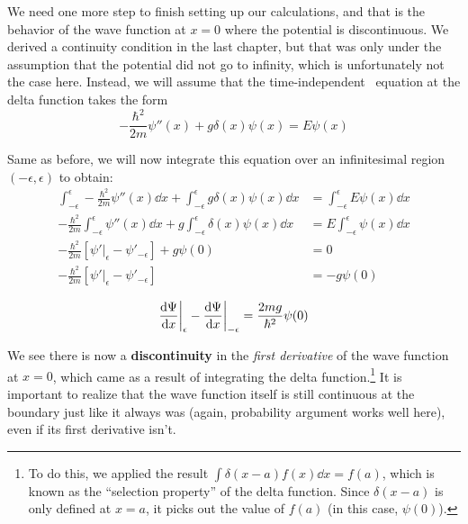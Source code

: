 We need one more step to finish setting up our calculations, and that is the behavior of the wave function at $x=0$ where the potential is discontinuous. We derived a continuity condition in the last chapter, but that was only under the assumption that the potential did not go to infinity, which is unfortunately not the case here. Instead, we will assume that the time-independent \Sch\ equation at the delta function takes the form 
\begin{equation*}
	-\frac{\hbar^2}{2m} \psi''(x) + g\delta(x) \psi(x) = E\psi(x)
\end{equation*}

Same as before, we will now integrate this equation over an infinitesimal region $(-\epsilon,\epsilon)$ to obtain:
\begin{align*}
	\int_{-\epsilon}^{\epsilon} -\frac{\hbar^2}{2m}  \psi''(x) \dd{x} + \int_{-\epsilon}^{\epsilon} g\delta(x) \psi(x) \dd{x} &= \int_{-\epsilon}^{\epsilon} E\psi(x) \dd{x} \\
	-\frac{\hbar^2}{2m} \int_{-\epsilon}^{\epsilon} \psi''(x) \dd{x} + g \int_{-\epsilon}^{\epsilon} \delta(x) \psi(x) \dd{x} &= E \int_{-\epsilon}^{\epsilon} \psi(x) \dd{x} \\
	-\frac{\hbar^2}{2m} \left[ \psi'|_{\epsilon} - \psi'_{-\epsilon} \right] + g \psi(0) &= 0 \\
	-\frac{\hbar^2}{2m} \left[ \psi'|_{\epsilon} - \psi'_{-\epsilon} \right] &= -g \psi(0)
\end{align*}

\begin{tcolorbox}[title = Continuity across the delta function potential] \vspace{-2ex}
	\begin{equation}
	\dv{\Psi}{x} \bigg|_{\epsilon} - \dv{\Psi}{x} \bigg|_{-\epsilon} = \frac{2mg}{\hbar^2}\psi(0) \label{eq:kp-cont}
	\end{equation}
\end{tcolorbox}

We see there is now a \textbf{discontinuity} in the \emph{first derivative} of the wave function at $x=0$, which came as a result of integrating the delta function.\footnote{To do this, we applied the result $\int\delta(x-a)f(x) \dd{x} = f(a)$, which is known as the ``selection property'' of the delta function. Since $\delta(x-a)$ is only defined at $x=a$, it picks out the value of $f(a)$ (in this case, $\psi(0)$).} It is important to realize that the wave function itself is still continuous at the boundary just like it always was (again, probability argument works well here), even if its first derivative isn't. \par 

